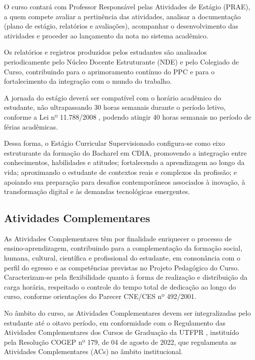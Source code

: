 O curso contará com Professor Responsável pelas Atividades de Estágio (PRAE), a quem compete avaliar a pertinência das atividades, analisar a documentação (plano de estágio, relatórios e avaliações), acompanhar o desenvolvimento das atividades e proceder ao lançamento da nota no sistema acadêmico.

Os relatórios e registros produzidos pelos estudantes são analisados periodicamente pelo Núcleo Docente Estruturante (NDE) e pelo Colegiado de Curso, contribuindo para o aprimoramento contínuo do PPC e para o fortalecimento da integração com o mundo do trabalho.

A jornada do estágio deverá ser compatível com o horário acadêmico do estudante, não ultrapassando 30 horas semanais durante o período letivo, conforme a Lei nº 11.788/2008 \cite{LDE_2008}, podendo atingir 40 horas semanais no período de férias acadêmicas.

Dessa forma, o Estágio Curricular Supervisionado configura-se como eixo estruturante da formação do Bacharel em CDIA, promovendo a integração entre conhecimentos, habilidades e atitudes; fortalecendo a aprendizagem ao longo da vida; aproximando o estudante de contextos reais e complexos da profissão; e apoiando sua preparação para desafios contemporâneos associados à inovação, à transformação digital e às demandas tecnológicas emergentes.

\subsection{Atividades Complementares}

As Atividades Complementares têm por finalidade enriquecer o processo de ensino-aprendizagem, contribuindo para a complementação da formação social, humana, cultural, científica e profissional do estudante, em consonância com o perfil do egresso e as competências previstas no Projeto Pedagógico do Curso. Caracterizam-se pela flexibilidade quanto à forma de realização e distribuição da carga horária, respeitado o controle do tempo total de dedicação ao longo do curso, conforme orientações do Parecer CNE/CES nº 492/2001.

No âmbito do curso, as Atividades Complementares devem ser integralizadas pelo estudante até o oitavo período, em conformidade com o Regulamento das Atividades Complementares dos Cursos de Graduação da UTFPR \cite{UTFPR_AC_2007}, instituído pela Resolução COGEP nº 179, de 04 de agosto de 2022, que regulamenta as Atividades Complementares (ACs) no âmbito institucional.

